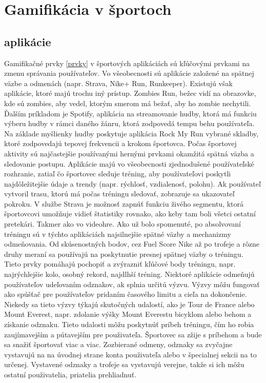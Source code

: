 \documentclass[10pt,twoside,slovak,a4paper]{article}
\begin{document}
\section{Gamifikácia v športoch} \label{gamifikacia v športoch}
\subsection{aplikácie} \label{aplikácie}

Gamifikačné prvky \ref{prvky} v športových aplikáciách sú kľúčovými prvkami na zmenu správania používateľov. Vo všeobecnosti sú aplikácie založené na spätnej väzbe a odmenách (napr. Strava, Nike+ Run, Runkeeper). Existujú však aplikácie, ktoré majú trochu iný prístup. Zombies Run, bežec vidí na obrazovke, kde sú zombies, aby vedel, ktorým smerom má bežať, aby ho zombie nechytili. Ďalším príkladom je Spotify, aplikácia na streamovanie hudby, ktorá má funkciu výberu hudby v rámci daného žánru, ktorá zodpovedá tempu behu používateľa. Na základe myšlienky hudby poskytuje aplikácia Rock My Run vybrané skladby, ktoré zodpovedajú tepovej frekvencii a krokom športovca. Počas športovej aktivity sú najčastejšie používanými hernými prvkami okamžitá spätná väzba a sledovanie postupu. Aplikácie majú vo všeobecnosti zjednodušené používateľské rozhranie, zatiaľ čo športovec sleduje tréning, aby používateľovi poskytli najdôležitejšie údaje a trendy (napr. rýchlosť, vzdialenosť, polohu). Ak používateľ vytvoril trasu, ktorú má počas tréningu sledovať, zobrazuje sa ukazovateľ pokroku. V službe Strava je možnosť zapnúť funkciu živého segmentu, ktorá športovcovi umožňuje vidieť štatistiky rovnako, ako keby tam boli všetci ostatní pretekári. Takmer ako vo videohre.\cite{Gamification_in_sport_apps-Framework}
Ako už bolo spomenuté, po absolvovaní tréningu sú v týchto aplikáciách najsilnejšie spätné väzby a mechanizmy odmeňovania. Od skúsenostných bodov, cez Fuel Score Nike až po trofeje a rôzne druhy meraní sa používajú na poskytnutie presnej spätnej väzby o tréningu. Tieto prvky pomáhajú pochopiť a zvýrazniť kľúčové body tréningu, napr. najrýchlejšie kolo, osobný rekord, najdlhší tréning.
Niektoré aplikácie odmeňujú používateľov udeľovaním odznakov, ak splnia určitú výzvu. Výzvy môžu fungovať ako spúšťač pre používateľov pridaním časového limitu a cieľa na dokončenie. Niekedy sa tieto výzvy týkajú skutočných udalostí, ako je Tour de France alebo Mount Everest, napr. zdolanie výšky Mount Everestu bicyklom alebo behom a získanie odznaku. Tieto udalosti môžu poskytnúť príbeh tréningu, čím ho robia zaujímavejším a pútavejším pre použivateľa. Športovec sa zžije s príbehom a bude sa snažiť športovať viac a viac. Zozbierané odmeny, odznaky sa zvyčajne vystavujú na na úvodnej strane konta použivateľa alebo v špecialnej sekcii na to určenej. Vystavené odznaky a trofeje sa vystavujú verejne, takže si ich môžu ostatní použivatelia, priatelia prehliadnuť.\cite{Effect_of_gamification-Framework}
\end{document}
